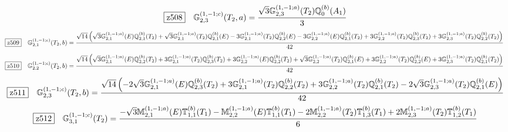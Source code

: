 \documentclass[fleqn,10pt,landscape]{jsarticle}
\begin{document}
\begin{dmath*}
\hspace*{3mm}\fbox{z508}\quad \mathbb{G}_{2,3}^{(1,-1;c)}(T_{2},a)=\frac{\sqrt{3} \mathbb{G}_{2,3}^{(1,-1;a)}(T_{2}) \mathbb{Q}_{0}^{(b)}(A_{1})}{3}
\end{dmath*}
\begin{dmath*}
\hspace*{3mm}\fbox{z509}\quad \mathbb{G}_{2,1}^{(1,-1;c)}(T_{2},b)=\frac{\sqrt{14} \left(\sqrt{3} \mathbb{G}_{2,1}^{(1,-1;a)}(E) \mathbb{Q}_{2,1}^{(b)}(T_{2}) + \sqrt{3} \mathbb{G}_{2,1}^{(1,-1;a)}(T_{2}) \mathbb{Q}_{2,1}^{(b)}(E) - 3 \mathbb{G}_{2,1}^{(1,-1;a)}(T_{2}) \mathbb{Q}_{2,2}^{(b)}(E) - 3 \mathbb{G}_{2,2}^{(1,-1;a)}(E) \mathbb{Q}_{2,1}^{(b)}(T_{2}) + 3 \mathbb{G}_{2,2}^{(1,-1;a)}(T_{2}) \mathbb{Q}_{2,3}^{(b)}(T_{2}) + 3 \mathbb{G}_{2,3}^{(1,-1;a)}(T_{2}) \mathbb{Q}_{2,2}^{(b)}(T_{2})\right)}{42}
\end{dmath*}
\begin{dmath*}
\hspace*{3mm}\fbox{z510}\quad \mathbb{G}_{2,2}^{(1,-1;c)}(T_{2},b)=\frac{\sqrt{14} \left(\sqrt{3} \mathbb{G}_{2,1}^{(1,-1;a)}(E) \mathbb{Q}_{2,2}^{(b)}(T_{2}) + 3 \mathbb{G}_{2,1}^{(1,-1;a)}(T_{2}) \mathbb{Q}_{2,3}^{(b)}(T_{2}) + 3 \mathbb{G}_{2,2}^{(1,-1;a)}(E) \mathbb{Q}_{2,2}^{(b)}(T_{2}) + \sqrt{3} \mathbb{G}_{2,2}^{(1,-1;a)}(T_{2}) \mathbb{Q}_{2,1}^{(b)}(E) + 3 \mathbb{G}_{2,2}^{(1,-1;a)}(T_{2}) \mathbb{Q}_{2,2}^{(b)}(E) + 3 \mathbb{G}_{2,3}^{(1,-1;a)}(T_{2}) \mathbb{Q}_{2,1}^{(b)}(T_{2})\right)}{42}
\end{dmath*}
\begin{dmath*}
\hspace*{3mm}\fbox{z511}\quad \mathbb{G}_{2,3}^{(1,-1;c)}(T_{2},b)=\frac{\sqrt{14} \left(- 2 \sqrt{3} \mathbb{G}_{2,1}^{(1,-1;a)}(E) \mathbb{Q}_{2,3}^{(b)}(T_{2}) + 3 \mathbb{G}_{2,1}^{(1,-1;a)}(T_{2}) \mathbb{Q}_{2,2}^{(b)}(T_{2}) + 3 \mathbb{G}_{2,2}^{(1,-1;a)}(T_{2}) \mathbb{Q}_{2,1}^{(b)}(T_{2}) - 2 \sqrt{3} \mathbb{G}_{2,3}^{(1,-1;a)}(T_{2}) \mathbb{Q}_{2,1}^{(b)}(E)\right)}{42}
\end{dmath*}
\begin{dmath*}
\hspace*{3mm}\fbox{z512}\quad \mathbb{G}_{3,1}^{(1,-1;c)}(T_{2})=\frac{- \sqrt{3} \mathbb{M}_{2,1}^{(1,-1;a)}(E) \mathbb{T}_{1,1}^{(b)}(T_{1}) - \mathbb{M}_{2,2}^{(1,-1;a)}(E) \mathbb{T}_{1,1}^{(b)}(T_{1}) - 2 \mathbb{M}_{2,2}^{(1,-1;a)}(T_{2}) \mathbb{T}_{1,3}^{(b)}(T_{1}) + 2 \mathbb{M}_{2,3}^{(1,-1;a)}(T_{2}) \mathbb{T}_{1,2}^{(b)}(T_{1})}{6}
\end{dmath*}
\end{document}
